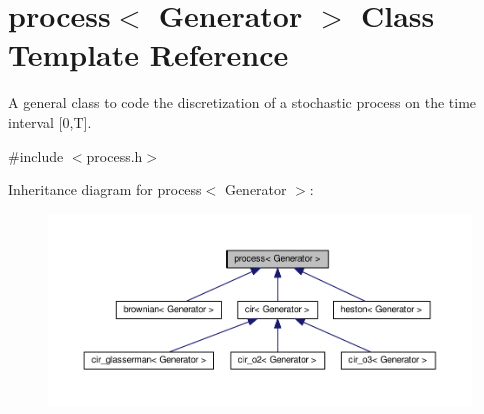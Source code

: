 \hypertarget{classprocess}{}\section{process$<$ Generator $>$ Class Template Reference}
\label{classprocess}


A general class to code the discretization of a stochastic process on the time interval \mbox{[}0,T\mbox{]}.  




{\ttfamily \#include $<$process.\+h$>$}



Inheritance diagram for process$<$ Generator $>$\+:\nopagebreak
\begin{figure}[H]
\begin{center}
\leavevmode
\includegraphics[width=350pt]{classprocess__inherit__graph}
\end{center}
\end{figure}
